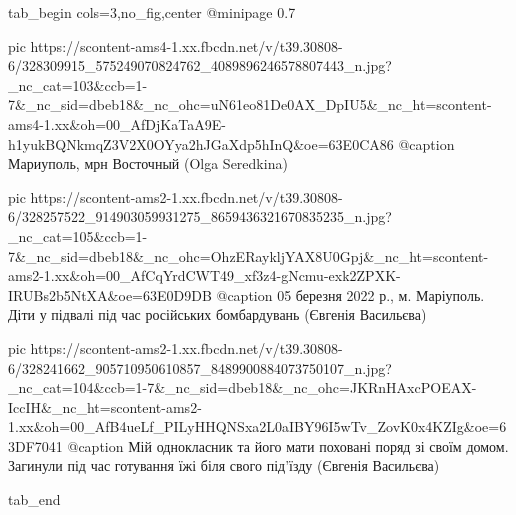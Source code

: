  
 
 
 
 


\begin{center}
\begin{minipage}{\textwidth}

\ifcmt
  tab_begin cols=3,no_fig,center
     @minipage 0.7

     pic https://scontent-ams4-1.xx.fbcdn.net/v/t39.30808-6/328309915_575249070824762_4089896246578807443_n.jpg?_nc_cat=103&ccb=1-7&_nc_sid=dbeb18&_nc_ohc=uN61eo81De0AX_DpIU5&_nc_ht=scontent-ams4-1.xx&oh=00_AfDjKaTaA9E-h1yukBQNkmqZ3V2X0OYya2hJGaXdp5hInQ&oe=63E0CA86
     @caption Мариуполь, мрн Восточный (Olga Seredkina)

     pic https://scontent-ams2-1.xx.fbcdn.net/v/t39.30808-6/328257522_914903059931275_8659436321670835235_n.jpg?_nc_cat=105&ccb=1-7&_nc_sid=dbeb18&_nc_ohc=OhzERaykljYAX8U0Gpj&_nc_ht=scontent-ams2-1.xx&oh=00_AfCqYrdCWT49_xf3z4-gNcmu-exk2ZPXK-IRUBs2b5NtXA&oe=63E0D9DB
     @caption 05 березня 2022 р., м. Маріуполь. Діти у підвалі під час російських бомбардувань (Євгенія Васильєва)

     pic https://scontent-ams2-1.xx.fbcdn.net/v/t39.30808-6/328241662_905710950610857_8489900884073750107_n.jpg?_nc_cat=104&ccb=1-7&_nc_sid=dbeb18&_nc_ohc=JKRnHAxcPOEAX-IccIH&_nc_ht=scontent-ams2-1.xx&oh=00_AfB4ueLf_PILyHHQNSxa2L0aIBY96I5wTv_ZovK0x4KZIg&oe=63DF7041
     @caption Мій однокласник та його мати поховані поряд зі своїм домом. Загинули під час готування їжі біля свого під'їзду (Євгенія Васильєва)

  tab_end
\fi
\end{minipage}
\end{center}
